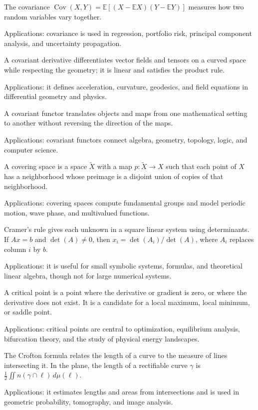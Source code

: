 The covariance $\operatorname{Cov}(X,Y)=\mathbb E[(X-\mathbb EX)(Y-\mathbb EY)]$ measures how two random variables vary together. \par\noindent Applications: covariance is used in regression, portfolio risk, principal component analysis, and uncertainty propagation.

A covariant derivative differentiates vector fields and tensors on a curved space while respecting the geometry; it is linear and satisfies the product rule. \par\noindent Applications: it defines acceleration, curvature, geodesics, and field equations in differential geometry and physics.

A covariant functor translates objects and maps from one mathematical setting to another without reversing the direction of the maps.  \par\noindent Applications: covariant functors connect algebra, geometry, topology, logic, and computer science.

A covering space is a space $\widetilde X$ with a map $p:\widetilde X\to X$ such that each point of $X$ has a neighborhood whose preimage is a disjoint union of copies of that neighborhood. \par\noindent Applications: covering spaces compute fundamental groups and model periodic motion, wave phase, and multivalued functions.

Cramer's rule gives each unknown in a square linear system using determinants. If $Ax=b$ and $\det(A)\ne0$, then $x_i=\det(A_i)/\det(A)$, where $A_i$ replaces column $i$ by $b$. \par\noindent Applications: it is useful for small symbolic systems, formulas, and theoretical linear algebra, though not for large numerical systems.

A critical point is a point where the derivative or gradient is zero, or where the derivative does not exist. It is a candidate for a local maximum, local minimum, or saddle point. \par\noindent Applications: critical points are central to optimization, equilibrium analysis, bifurcation theory, and the study of physical energy landscapes.

The Crofton formula relates the length of a curve to the measure of lines intersecting it. In the plane, the length of a rectifiable curve $\gamma$ is $\frac12\iint n(\gamma\cap\ell)\,d\mu(\ell)$. \par\noindent Applications: it estimates lengths and areas from intersections and is used in geometric probability, tomography, and image analysis.

